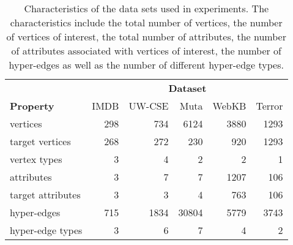 \begin{table}
\captionsetup{justification=justified}
\begin{center}
\caption[Characteristics of the datasets used in the relational clustering experiments]{Characteristics of the data sets used in experiments. The characteristics include the total number of vertices, the number of vertices of interest, the total number of attributes, the number of attributes associated with vertices of interest, the number of hyper-edges as well as the number of different hyper-edge types.}
\label{tab:Data}
\begin{tabular}[t]{@{}lrrrrr@{}}


		\toprule
						  & \multicolumn{5}{c}{\textbf{Dataset}} \\
						  \cmidrule{2-6}
		\textbf{Property} & IMDB   & UW-CSE & Muta & WebKB & Terror \\
		\midrule
		vertices & 298  & 734 & 6124 & 3880  & 1293\\

		target vertices & 268 & 272  & 230 & 920  & 1293 \\

		vertex types & 3  & 4 & 2  & 2  & 1 \\

		attributes & 3   & 7 & 7 & 1207  & 106 \\

		target attributes & 3  & 3 & 4 & 763  & 106\\

		hyper-edges & 715  & 1834 & 30804 & 5779  & 3743\\

		hyper-edge types  & 3   & 6 & 7 & 4 & 2 \\
		\bottomrule


\end{tabular}
\end{center}

\end{table}



